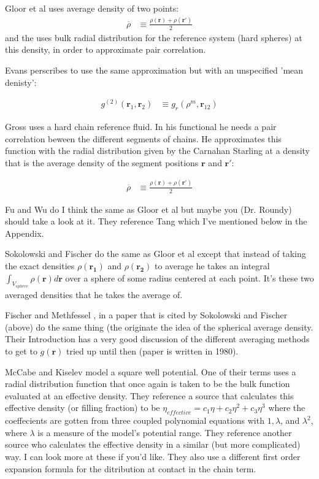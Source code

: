 \documentclass[letterpaper,twocolumn,amsmath,amssymb,pre,aps,10pt]{revtex4-1}
\newcommand{\red}[1]{{\bf \color{red} #1}}
\newcommand{\rr}{\textbf{r}}
\newcommand{\fixme}[1]{\text{\red{[#1]}}}
\begin{document}
Gloor et al \cite{gloor2007prediction} uses average density of two points:
\begin{align}
\overline{\rho} &\equiv \frac{\rho(\rr)+\rho(\rr')}{2}
\end{align}
and the uses bulk radial distribution for the reference system (hard
spheres) at this density, in order to approximate pair correlation.

Evans \cite{evans1992density}perscribes to use the same approximation but with an unspecified 'mean denisty':

\begin{align}
g^{(2)}(\rr_1,\rr_2) &\equiv g_r(\rho^m,\rr_{12})
\end{align}

Gross \cite{gross2009density} uses a hard chain reference fluid.  In
his functional he needs a pair correlation beween the different
segments of chains.  He approximates this function with the radial
distribution given by the Carnahan Starling at a density that is the
average density of the segment positions $\rr$ and $\rr'$:

\begin{align}
\overline{\rho} &\equiv \frac{\rho(\rr)+\rho(\rr')}{2}
\end{align}

Fu and Wu \cite{fu2005vapor} do I think the same as Gloor et al but
maybe you (Dr. Roundy) should take a look at it.  They reference Tang
\cite{tang2008accurate} which I've mentioned below in the Appendix.
\fixme{DJR: Not same as Gloor, they do a WDA approximation.}


Sokolowski and Fischer \cite{sokolowski1992role} do the same as Gloor
et al except that instead of taking the exact densities
$\rho(\mathbf{r_1})$ and $\rho(\mathbf{r_2})$ to average he takes an
integral $\int_{V_{sphere}} \rho(\mathbf{r})d\mathbf{r}$ over a sphere
of some radius centered at each point.  It's these two averaged
densities that he takes the average of.

Fischer and Methfessel \cite{fischer1980born}, in a paper that is
cited by Sokolowski and Fischer (above) do the same thing (the
originate the idea of the spherical average density.  Their
Introduction has a very good discussion of the different averaging
methods to get to $g(\mathbf{r})$ tried up until then (paper is
written in 1980).


McCabe and Kiselev \cite{mccabe2004application} model a square well
potential.  One of their terms uses a radial distribution function
that once again is taken to be the bulk function evaluated at an
effective density.  They reference a source that calculates this
effective density (or filling fraction) to be $\eta_{effective} =
c_1\eta + c_2\eta^2 + c_3\eta^3$ where the coeffecients are gotten
from three coupled polynomial equations with $1,\lambda$, and
$\lambda^2$, where $\lambda$ is a measure of the model's potential
range.  They reference another source who calculates the effective
density in a similar (but more complicated) way.  I can look more at
these if you'd like.  They also use a different first order expansion
formula for the ditribution at contact in the chain term.
\end{document}
